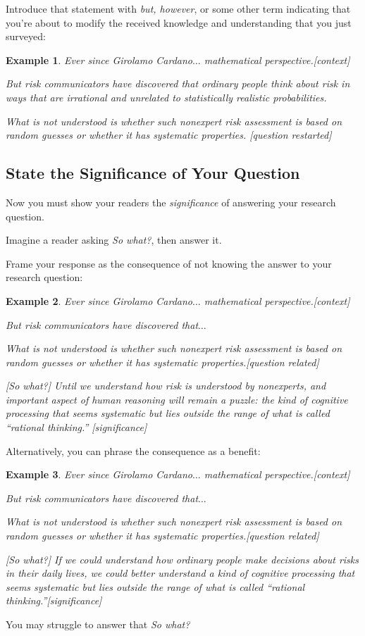 \documentclass[oneside]{book}
\numberwithin{equation}{section}
\newtheorem{example}{Example}[section]
\begin{document}
Introduce that statement with \textit{but, however}, or some other term indicating that you're about to modify the received knowledge and understanding that you just surveyed:
\begin{example}
    Ever since Girolamo Cardano$\ldots$ mathematical perspective.\emph{[context]}
    
    But risk communicators have discovered that ordinary people think about risk in ways that are irrational and unrelated to statistically realistic probabilities.
    
    What is not understood is whether such nonexpert risk assessment is based on random guesses or whether it has systematic properties. \emph{[question restarted]}
\end{example}

\subsection{State the Significance of Your Question}
Now you must show your readers the \textit{significance} of answering your research question.

Imagine a reader asking \textit{So what?}, then answer it.

Frame your response as the consequence of not knowing the answer to your research question:
\begin{example}
    Ever since Girolamo Cardano$\ldots$ mathematical perspective.\emph{[context]}
    
    But risk communicators have discovered that$\ldots$
    
    What is not understood is whether such nonexpert risk assessment is based on random guesses or whether it has systematic properties.\emph{[question related]} 
    
    \emph{[So what?] Until we understand how risk is understood by nonexperts, and important aspect of human reasoning will remain a puzzle: the kind of cognitive processing that seems systematic but lies outside the range of what is called ``rational thinking.'' [significance]}
\end{example}
Alternatively, you can phrase the consequence as a benefit:
\begin{example}
    Ever since Girolamo Cardano$\ldots$ mathematical perspective.\emph{[context]}
    
    But risk communicators have discovered that$\ldots$
    
    What is not understood is whether such nonexpert risk assessment is based on random guesses or whether it has systematic properties.\emph{[question related]} 
    
    \emph{[So what?] If we could understand how ordinary people make decisions about risks in their daily lives, we could better understand a kind of cognitive processing that seems systematic but lies outside the range of what is called ``rational thinking.''[significance]}
\end{example}
You may struggle to answer that \textit{So what?}
\end{document}
